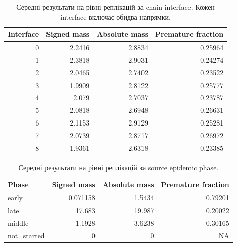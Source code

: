 \documentclass[11pt]{article}
\begin{document}
\begin{table}[H]\centering
\caption{Середні результати на рівні реплікацій за chain interface. Кожен interface включає обидва напрямки.}
\begin{tabular}{rrrr}\toprule
Interface & Signed mass & Absolute mass & Premature fraction \\\midrule
0 & 2.2416 & 2.8834 & 0.25964 \\
1 & 2.3818 & 2.9031 & 0.24274 \\
2 & 2.0465 & 2.7402 & 0.23522 \\
3 & 1.9909 & 2.8122 & 0.25777 \\
4 & 2.079 & 2.7037 & 0.23787 \\
5 & 2.0818 & 2.6948 & 0.26631 \\
6 & 2.1153 & 2.9129 & 0.25281 \\
7 & 2.0739 & 2.8717 & 0.26972 \\
8 & 1.9361 & 2.6318 & 0.23385 \\
\bottomrule\end{tabular}\end{table}

\begin{table}[H]\centering
\caption{Середні результати на рівні реплікацій за source epidemic phase.}
\begin{tabular}{lrrr}\toprule
Phase & Signed mass & Absolute mass & Premature fraction \\\midrule
early & 0.071158 & 1.5434 & 0.79201 \\
late & 17.683 & 19.987 & 0.20022 \\
middle & 1.1928 & 3.6238 & 0.30165 \\
not\_started & 0 & 0 & NA \\
\bottomrule\end{tabular}\end{table}
\end{document}
